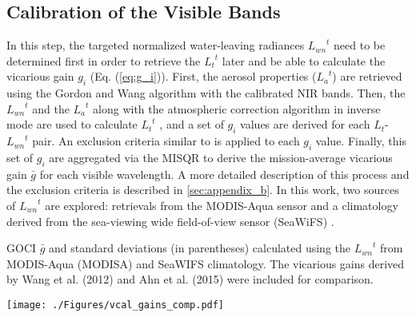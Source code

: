 \documentclass[10pt]{article}
\begin{document}
\subsection{Calibration of the Visible Bands}
In this step, the targeted normalized water-leaving radiances ${L_{wn}}^t$ need to be determined first in order to retrieve the ${L_t}^t$ later and be able to calculate the vicarious gain $g_i$ (Eq. (\ref{eq:g_i})).
First, the aerosol properties (${L_a}^t$) are retrieved using the Gordon and Wang algorithm \cite{Gordon1994} with the calibrated NIR bands.
Then, the ${L_{wn}}^t$ and the ${L_a}^t$ along with the atmospheric correction algorithm in inverse mode are used to calculate ${L_t}^t$ \cite{Franz:07}, and a set of $g_i$ values are derived for each $L_t$-${L_{wn}}^t$ pair.
An exclusion criteria similar to \cite{Bailey2006} is applied to each $g_i$ value.
Finally, this set of $g_i$ are aggregated via the MISQR to derive the mission-average vicarious gain $\bar{g}$ for each visible wavelength.
A more detailed description of this process and the exclusion criteria is described in \autoref{sec:appendix_b}.
In this work, two sources of ${L_{wn}}^t$ are explored: retrievals from the MODIS-Aqua sensor and a climatology derived from the sea-viewing wide field-of-view sensor (SeaWiFS) \cite{McClain2004}.

\begin{table}[htbp!]
\caption{GOCI $\bar{g}$ and standard deviations (in parentheses) calculated using the ${L_{wn}}^t$ from MODIS-Aqua (MODISA) and SeaWIFS climatology. The vicarious gains derived by Wang et al. (2012) \cite{Wang:13} and Ahn et al. (2015) \cite{Ahn2015} were included for comparison. \label{tab:vcal_gains_comp}}

  \centering
    \texttt{[image: ./Figures/vcal\_gains\_comp.pdf]}

\end{table}
\end{document}
